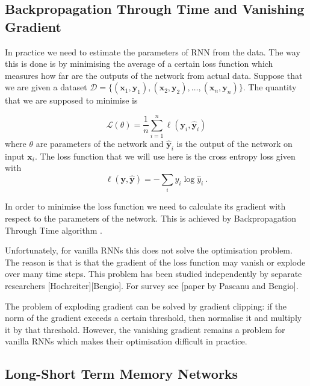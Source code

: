 \documentclass[titlepage]{report}
\begin{document}
\subsection{Backpropagation Through Time and Vanishing Gradient}

In practice we need to estimate the parameters of RNN from the data. The way this is done is by minimising the average of a certain loss function which measures how far are the outputs of the network from actual data. Suppose that we are given a dataset $\mathcal{D} = \{ (\mathbf{x}_1, \mathbf{y}_1), (\mathbf{x}_2, \mathbf{y}_2), \ldots, (\mathbf{x}_n, \mathbf{y}_n) \}$. The quantity that we are supposed to minimise is

\begin{equation*}
\mathcal{L}(\theta) = \frac{1}{n} \sum_{i = 1}^n \ell(\mathbf{y}_i, \mathbf{\hat{y}}_i)
\end{equation*}
where $\theta$ are parameters of the network and $\mathbf{\hat{y}}_i$ is the output of the network on input $\mathbf{x}_i$. The loss function that we will use here is the cross entropy loss given with
\begin{equation*}
\ell(\mathbf{y}, \mathbf{\hat{y}}) = - \sum_i y_i \log \hat{y}_i \: .
\end{equation*}

\noindent
In order to minimise the loss function we need to calculate its gradient with respect to the parameters of the network. This is achieved by Backpropagation Through Time algorithm \cite{werbos1990backpropagation}.

Unfortunately, for vanilla RNNs this does not solve the optimisation problem. The reason is that is that the gradient of the loss function may vanish or explode over many time steps. This problem has been studied independently by separate researchers [Hochreiter][Bengio]. For survey see [paper by Pascanu and Bengio].

The problem of exploding gradient can be solved by gradient clipping: if the norm of the gradient exceeds a certain threshold, then normalise it and multiply it by that threshold.
However, the vanishing gradient remains a problem for vanilla RNNs which makes their optimisation difficult in practice.

\subsection{Long-Short Term Memory Networks}
\end{document}
